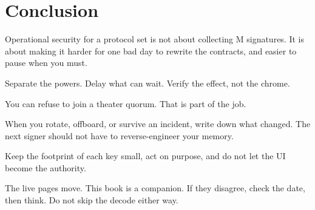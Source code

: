 \chapter{Conclusion}

Operational security for a protocol set is not
about collecting M signatures. It is about making
it harder for one bad day to rewrite the
contracts, and easier to pause when you must.

Separate the powers. Delay what can wait. Verify
the effect, not the chrome.

You can refuse to join a theater quorum. That is
part of the job.

When you rotate, offboard, or survive an incident,
write down what changed. The next signer should
not have to reverse-engineer your memory.

Keep the footprint of each key small, act on
purpose, and do not let the UI become the
authority.

The live pages move. This book is a companion.
If they disagree, check the date, then think.
Do not skip the decode either way.
